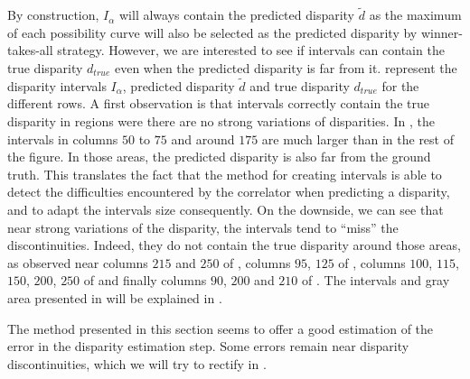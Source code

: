 By construction, $I_\alpha$ will always contain the predicted disparity $\tilde{d}$ as the maximum of each possibility curve will also be selected as the predicted disparity by winner-takes-all strategy. However, we are interested to see if intervals can contain the true disparity $d_{true}$ even when the predicted disparity is far from it.  represent the disparity intervals $I_\alpha$, predicted disparity $\tilde{d}$ and true disparity $d_{true}$ for the different rows. A first observation is that intervals correctly contain the true disparity in regions were there are no strong variations of disparities. In  , the intervals in columns $50$ to $75$ and around $175$ are much larger than in the rest of the figure. In those areas, the predicted disparity is also far from the ground truth. This translates the fact that the method for creating intervals is able to detect the difficulties encountered by the correlator when predicting a disparity, and to adapt the intervals size consequently. On the downside, we can see that near strong variations of the disparity, the intervals tend to ``miss'' the discontinuities. Indeed, they do not contain the true disparity around those areas, as observed near columns $215$ and $250$ of , columns $95$, $125$ of , columns $100$, $115$, $150$, $200$, $250$ of  
and finally columns $90$, $200$ and $210$ of . The intervals and gray area presented in  will be explained in .

The method presented in this section seems to offer a good estimation of the error in the disparity estimation step. Some errors remain near disparity discontinuities, which we will try to rectify in .

